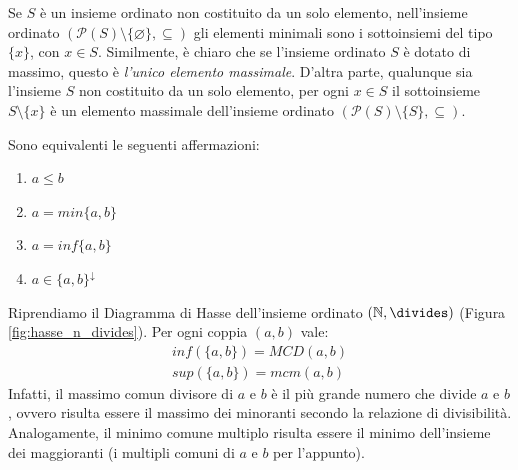 \begin{osservation}
	Se $S$ è un insieme ordinato non costituito da un solo elemento, nell'insieme ordinato $(\mathcal{P}(S)\setminus\{\varnothing\}, \subseteq)$ gli elementi minimali sono i sottoinsiemi del tipo $\{x\}$, con $x \in S$. Similmente, è chiaro che se l'insieme ordinato $S$ è dotato di massimo, questo è \textit{l'unico elemento massimale}. D'altra parte, qualunque sia l'insieme $S$ non costituito da un solo elemento, per ogni $x \in S$ il sottoinsieme $S \setminus \{x\}$ è un elemento massimale dell'insieme ordinato $(\mathcal{P}(S)\setminus \{S\}, \subseteq)$.
\end{osservation}

\begin{teorbox}
	Sono equivalenti le seguenti affermazioni:
	\begin{enumerate}
		\item $a \leq b$
		\item $a = min \{a,b\}$
		\item $a = inf\{a,b\}$
		\item $a \in \{a,b\}^{\downarrow}$
	\end{enumerate}
\end{teorbox}

\begin{osservation}
	Riprendiamo il Diagramma di Hasse dell'insieme ordinato $(\mathbb{N},\divides)$ (Figura \ref{fig:hasse_n_divides}). Per ogni coppia $(a,b)$ vale:
	\begin{eqnarray}
		inf(\{a,b\}) = MCD(a,b) \\
		sup(\{a,b\}) = mcm(a,b)
	\end{eqnarray}
Infatti, il massimo comun divisore di $a$ e $b$ è il più grande numero che divide $a$ e $b$, ovvero risulta essere il massimo dei minoranti secondo la relazione di divisibilità. Analogamente, il minimo comune multiplo risulta essere il minimo dell'insieme dei maggioranti (i multipli comuni di $a$ e $b$ per l'appunto).
\end{osservation}

